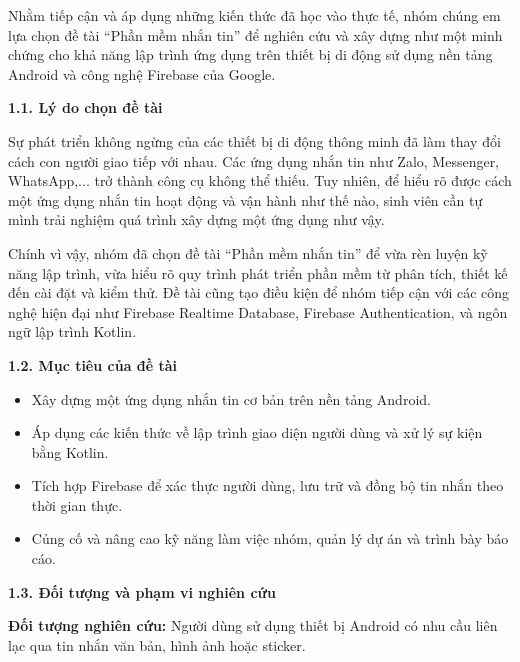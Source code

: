 \documentclass[12pt,a4paper]{article}
\begin{document}
	Nhằm tiếp cận và áp dụng những kiến thức đã học vào thực tế, nhóm chúng em lựa chọn đề tài “Phần mềm nhắn tin” để nghiên cứu và xây dựng như một minh chứng cho khả năng lập trình ứng dụng trên thiết bị di động sử dụng nền tảng Android và công nghệ Firebase của Google.
	
	\vspace{1cm}
	
	\noindent\textbf{1.1. Lý do chọn đề tài}
	
	\noindent
	Sự phát triển không ngừng của các thiết bị di động thông minh đã làm thay đổi cách con người giao tiếp với nhau. Các ứng dụng nhắn tin như Zalo, Messenger, WhatsApp,... trở thành công cụ không thể thiếu. Tuy nhiên, để hiểu rõ được cách một ứng dụng nhắn tin hoạt động và vận hành như thế nào, sinh viên cần tự mình trải nghiệm quá trình xây dựng một ứng dụng như vậy.
	
	Chính vì vậy, nhóm đã chọn đề tài “Phần mềm nhắn tin” để vừa rèn luyện kỹ năng lập trình, vừa hiểu rõ quy trình phát triển phần mềm từ phân tích, thiết kế đến cài đặt và kiểm thử. Đề tài cũng tạo điều kiện để nhóm tiếp cận với các công nghệ hiện đại như Firebase Realtime Database, Firebase Authentication, và ngôn ngữ lập trình Kotlin.
	
	\vspace{0.5cm}
	
	\noindent\textbf{1.2. Mục tiêu của đề tài}
	
	\begin{itemize}
		\item Xây dựng một ứng dụng nhắn tin cơ bản trên nền tảng Android.
		\item Áp dụng các kiến thức về lập trình giao diện người dùng và xử lý sự kiện bằng Kotlin.
		\item Tích hợp Firebase để xác thực người dùng, lưu trữ và đồng bộ tin nhắn theo thời gian thực.
		\item Củng cố và nâng cao kỹ năng làm việc nhóm, quản lý dự án và trình bày báo cáo.
	\end{itemize}
	
	\vspace{0.5cm}
	
	\noindent\textbf{1.3. Đối tượng và phạm vi nghiên cứu}
	
	\noindent\textbf{Đối tượng nghiên cứu:} Người dùng sử dụng thiết bị Android có nhu cầu liên lạc qua tin nhắn văn bản, hình ảnh hoặc sticker.
	
	\vspace{0.2cm}
	
\end{document}
